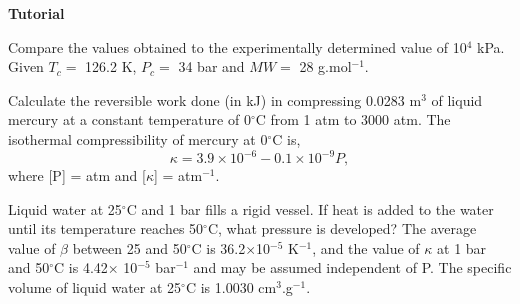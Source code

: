 \begin{MyTutorial}{\begin{center}{\bf Tutorial}\end{center}}
\begin{problem}
\begin{enumerate}
        \end{enumerate} 
     Compare the values obtained to the experimentally determined value of 10$^{4}$ kPa. Given $T_{c}=$ 126.2 K, $P_{c}=$ 34 bar and $MW=$ 28 g.mol$^{-1}$.
  \end{problem}
%
  \begin{problem}\label{Tut03:Hg} %
     Calculate the reversible work done (in kJ) in compressing 0.0283 m$^{3}$ of liquid mercury at a constant temperature of  0$^{\circ}$C from 1 atm to 3000 atm. The isothermal compressibility of mercury at 0$^{\circ}$C is,
     \begin{displaymath}
          \kappa = 3.9\times10^{-6} - 0.1\times 10^{-9}P,
     \end{displaymath}
where [P] = atm and [$\kappa$] = atm$^{-1}$.
  \end{problem}
%
  \begin{problem}\label{Tut03:kappa} 
     Liquid water at 25$^{\circ}$C and 1 bar fills a rigid vessel. If heat is added to the water until its temperature reaches 50$^{\circ}$C, what pressure is developed? The average value of $\beta$ between 25 and 50$^{\circ}$C is 36.2$\times$10$^{-5}$ K$^{-1}$, and the value of $\kappa$ at 1 bar and 50$^{\circ}$C is 4.42$\times$ 10$^{-5}$ bar$^{-1}$  and may be assumed independent of P. The specific volume of liquid water at 25$^{\circ}$C  is 1.0030 cm$^{3}$.g$^{-1}$.
  \end{problem}
%
\end{MyTutorial}
